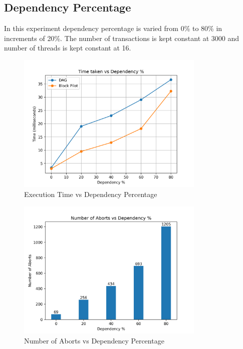 \documentclass[12pt]{article}
\begin{document}
\subsection{Dependency Percentage}
In this experiment dependency percentage is varied from 0\% to 80\% in increments of 20\%.
The number of transactions is kept constant at 3000 and number of threads is kept constant at 16.
\begin{figure}[h]
    \centering
    \includegraphics[width=0.8\textwidth]{images/dp_vs_Time.png}
    \caption{Execution Time vs Dependency Percentage}
    \label{fig:dp_vs_Time}
\end{figure}
\begin{figure}[h]
    \centering
    \includegraphics[width=0.8\textwidth]{images/dp_vs_Aborts.png}
    \caption{Number of Aborts vs Dependency Percentage}
    \label{fig:dp_vs_Aborts}
\end{figure}
\end{document}
